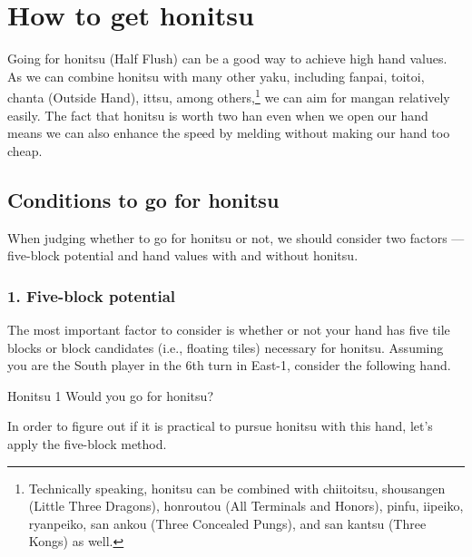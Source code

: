 \section{How to get {\jap honitsu}}\label{sec:hon}
Going for {\jap honitsu} (Half Flush) can be a good way to achieve high hand values. As we can combine {\jap honitsu} with many other {\jap yaku}, including {\jap fanpai}, {\jap toitoi}, {\jap chanta} (Outside Hand), {\jap ittsu}, among others,\footnote{Technically speaking, {\jap honitsu} can be combined with {\jap chiitoitsu}, {\jap shousangen} (Little Three Dragons), {\jap honroutou} (All Terminals and Honors), {\jap pinfu}, {\jap iipeiko}, {\jap ryanpeiko}, {\jap san ankou} (Three Concealed Pungs), and {\jap san kantsu} (Three Kongs) as well.}
we can aim for {\jap mangan} relatively easily.
The fact that {\jap honitsu} is worth two {\jap han} even when we open our hand means we can also enhance the speed by melding without making our hand too cheap.

\bigskip
\subsection{Conditions to go for {\jap honitsu}}
When judging whether to go for {\jap honitsu} or not, we should consider two factors --- five-block potential and hand values with and without {\jap honitsu}.

\subsubsection{1. Five-block potential}
The most important factor to consider is whether or not your hand has  five tile blocks or block candidates (i.e., floating tiles) necessary for {\jap honitsu}. Assuming you are the South player in the 6th turn in East-1, consider the following hand. 

\bigskip
\begin{itembox}[r]{{\jap Honitsu} 1}
\bp
{}\dong\dong\xi\zhong\zhong
\ep
\vspace{-10pt}Would you go for {\jap honitsu}? \vspace{-5pt}
\end{itembox}

\bigskip
In order to figure out if it is practical to pursue {\jap honitsu} with this hand, let's apply the five-block method. 
\bigskip
{}\emj

